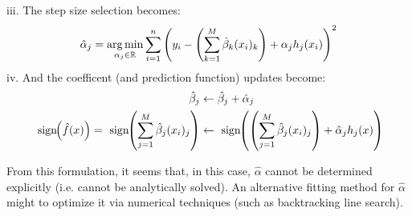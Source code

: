 iii. The step size selection becomes:
\begin{align}
    \hat{\alpha}_j = \operatorname*{arg\,min}_{\alpha_j \in \mathbb{R}}
    \sum_{i=1}^n \left( y_i - \left(\sum_{k=1}^M \hat{\beta}_k (x_i)_k \right)
        + \alpha_j h_j(x_i) 
        \right)^2
\end{align}
iv. And the coefficent (and prediction function) updates become:
\begin{align}
    \hat{\beta}_j  &\leftarrow \hat{\beta}_j + \hat{\alpha}_j\\
     \text{ sign}\hspace{-1mm} \left(\hat{f}(x)\right) = \text{
     sign}\hspace{-1mm}\left( \sum_{j=1}^M \hat{\beta}_j (x_i)_j \right)
     &\leftarrow \text{ sign}\hspace{-1mm} \left( \left( \sum_{j=1}^M
     \hat{\beta}_j (x_i)_j \right) + \hat{\alpha}_j h_j(x) \right)
\end{align}

From this formulation, it seems that, in this case, $\hat{\alpha}$ cannot be
determined explicitly (i.e. cannot be analytically solved). An alternative
fitting method for $\hat{\alpha}$ might to optimize it via numerical techniques 
(such as backtracking line  search).


